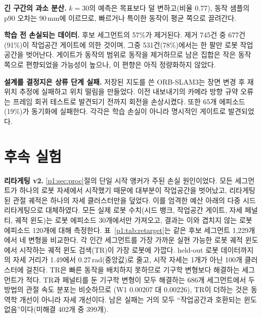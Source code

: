 \documentclass[conference,10pt]{IEEEtran}
\newcommand{\mm}{\,mm\xspace}
\begin{document}
\textbf{긴 구간의 과소 분산.} $k{=}30$의 예측은 목표보다 덜 변하고(비율 0.77), 동작 샘플의 p90 오차는 90\mm{}에 이르므로, 빠르거나
특이한 동작이 평균 쪽으로 끌려간다.

\textbf{학습 전 손실되는 데이터.} 후보 세그먼트의 57\%가 제거된다. 제거 745건 중 677건(91\%)이 작업공간 게이트에 의한 것이며, 그중
531건(78\%)에서는 한 팔만 로봇 작업공간을 벗어난다. 게이트가 동작의 범위로 동작을 제거하므로 남은 집합은 작은 동작 쪽으로 편향되었을
가능성이 높으나, 이 편향은 아직 정량화하지 않았다.

\textbf{설계를 결정지은 상류 단계 실패.} 저장된 지도를 쓴 ORB-SLAM3는 장면 변경 후 재위치 추정에 실패하고 위치 떨림을 만들었다.
이전 내보내기의 카메라 방향 규약 오류는 프레임 회귀 테스트로 발견되기 전까지 회전을 손상시켰다. 또한 65개 에피소드(19\%)가 동기화에
실패한다. 각각은 학습 손실이 아니라 명시적인 게이트로 발견되었다.

\section{후속 실험}\label{p1:sec:follow}
\textbf{리타게팅 v2.} \ref{p1:sec:proc}절의 단일 시작 앵커가 주된 손실 원인이었다. 모든 세그먼트가 하나의 로봇 자세에서 시작했기 때문에
대부분이 작업공간을 벗어났고, 리타게팅된 관절 궤적은 하나의 자세 클러스터만을 덮었다. 이를 엄격한 예산 아래의 다중 시드 리타게팅으로
대체하였다. 모든 실제 로봇 수치(시드 뱅크, 작업공간 게이트, 자세 페널티, 궤적 윈도)는 로봇 에피소드 30개에서만 가져오고, 결과는 이와
겹치지 않는 로봇 에피소드 120개에 대해 측정한다. 표~\ref{p1:tab:retarget}는 같은 후보 세그먼트 1{,}229개에서 네 변형을 비교한다. 각 인간
세그먼트를 가장 가까운 실현 가능한 로봇 궤적 윈도에서 시작하는 궤적 윈도 검색(TR)이 가장 로봇에 가깝다. held-out 로봇 데이터까지의 자세
거리가 1.49에서 0.27\,rad(중앙값)로 줄고, 시작 자세는 1개가 아닌 100개 클러스터에 걸친다. TR은 빠른 동작을 배치하지 못하므로 기구학
변형보다 해결하는 세그먼트가 적다. TR과 페널티를 둔 기구학 변형이 모두 해결하는 686개 세그먼트에서 두 방법의 관절 속도 분포는 비슷하므로
(W1 0.00207 대 0.00226), TR이 더하는 것은 동역학 개선이 아니라 자세 개선이다. 남은 실패는 거의 모두 ``작업공간과 호환되는 윈도
없음''이다(미해결 402개 중 399개).
\end{document}
